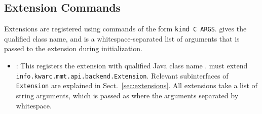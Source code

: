 \subsection{Extension Commands}\label{sec:shell:extensions}
Extensions are registered using commands of the form \texttt{kind C ARGS}.  gives the qualified class name, and  is a whitespace-separated list of arguments that is passed to the extension during initialization.

\begin{itemize}
\item {}: This registers the extension with qualified Java class name .  must extend  \texttt{info.kwarc.mmt.api.backend.Extension}. Relevant subinterfaces of \texttt{Extension} are explained in Sect.~\ref{sec:extensions}.
All extensions take a list of string arguments, which is passed as  where the arguments separated by whitespace.
\end{itemize}